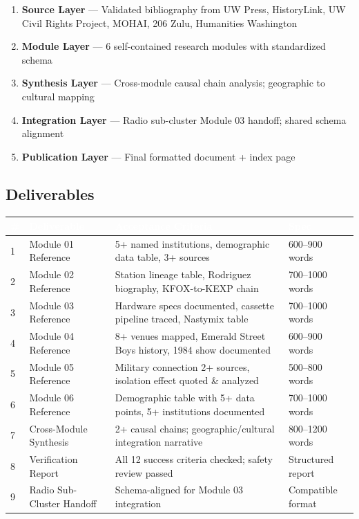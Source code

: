 \documentclass[11pt,letterpaper]{article}
\newcommand{\tableheader}[1]{\textbf{\sffamily\textcolor{white}{#1}}}
\begin{document}
\begin{enumerate}
  \item \textbf{Source Layer} --- Validated bibliography from UW Press, HistoryLink, UW Civil Rights Project, MOHAI, 206 Zulu, Humanities Washington
  \item \textbf{Module Layer} --- 6 self-contained research modules with standardized schema
  \item \textbf{Synthesis Layer} --- Cross-module causal chain analysis; geographic to cultural mapping
  \item \textbf{Integration Layer} --- Radio sub-cluster Module 03 handoff; shared schema alignment
  \item \textbf{Publication Layer} --- Final formatted document + index page
\end{enumerate}

\subsection{Deliverables}

\begin{center}
\begin{tabularx}{\textwidth}{C{0.5cm}L{3.5cm}L{4cm}L{3.5cm}}
\toprule
{}
\tableheader{\#} & \tableheader{Deliverable} & \tableheader{Acceptance Criteria} & \tableheader{Spec} \\
 & Module 01 Reference & 5+ named institutions, demographic data table, 3+ sources & 600--900 words \\
2 & Module 02 Reference & Station lineage table, Rodriguez biography, KFOX-to-KEXP chain & 700--1000 words \\
3 & Module 03 Reference & Hardware specs documented, cassette pipeline traced, Nastymix table & 700--1000 words \\
4 & Module 04 Reference & 8+ venues mapped, Emerald Street Boys history, 1984 show documented & 600--900 words \\
5 & Module 05 Reference & Military connection 2+ sources, isolation effect quoted \& analyzed & 500--800 words \\
6 & Module 06 Reference & Demographic table with 5+ data points, 5+ institutions documented & 700--1000 words \\
7 & Cross-Module Synthesis & 2+ causal chains; geographic/cultural integration narrative & 800--1200 words \\
8 & Verification Report & All 12 success criteria checked; safety review passed & Structured report \\
9 & Radio Sub-Cluster Handoff & Schema-aligned for Module 03 integration & Compatible format \\
\bottomrule
\end{tabularx}
\end{center}
\end{document}
